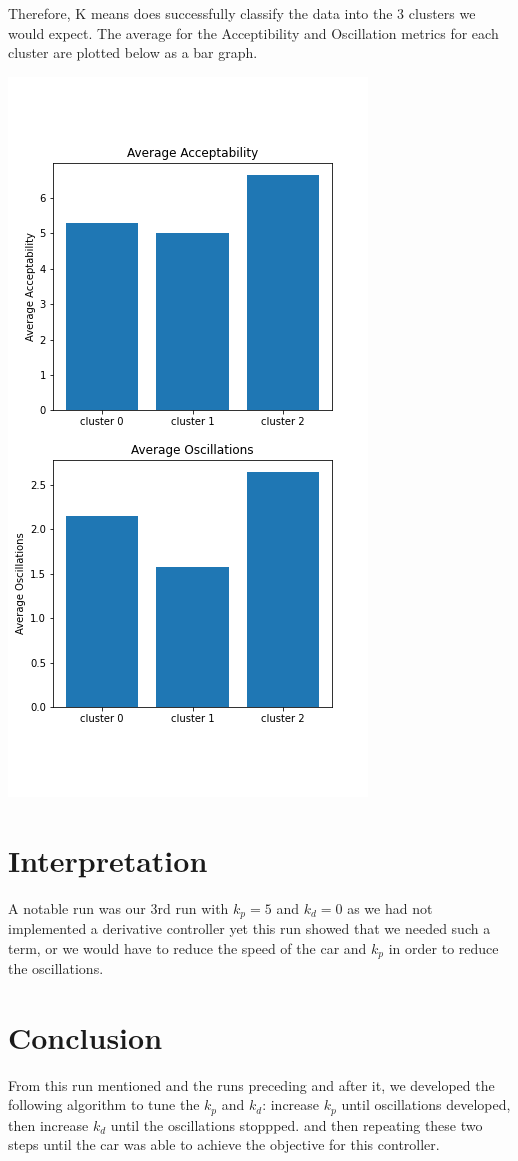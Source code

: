 \documentclass[12pt]{article}
\begin{document}
\begin{multicols}{2}
\begin{center}
\end{center}
Therefore, K means does successfully classify the data into the 3 clusters we would expect. The average for the Acceptibility and 
Oscillation metrics for each cluster are plotted below as a bar graph.
\begin{center}
\includegraphics*[scale=0.3]{KpKiAllTSNEKMeansAverage.png}
\end{center}
\section*{Interpretation}
A notable run was our 3rd run with $k_p=5$ and $k_d=0$ as we had not implemented a derivative controller yet
this run showed that we needed such a term, or we would have to reduce the speed of the car and $k_p$ in order to
reduce the oscillations. 

\section*{Conclusion}
From this run mentioned and the runs preceding and after it, we developed the following algorithm to tune the
$k_p$ and $k_d$: increase $k_p$ until oscillations developed, then increase $k_d$ until the oscillations stoppped.
and then repeating these two steps until the car was able to achieve the objective for this controller.
\end{multicols}
\end{document}
